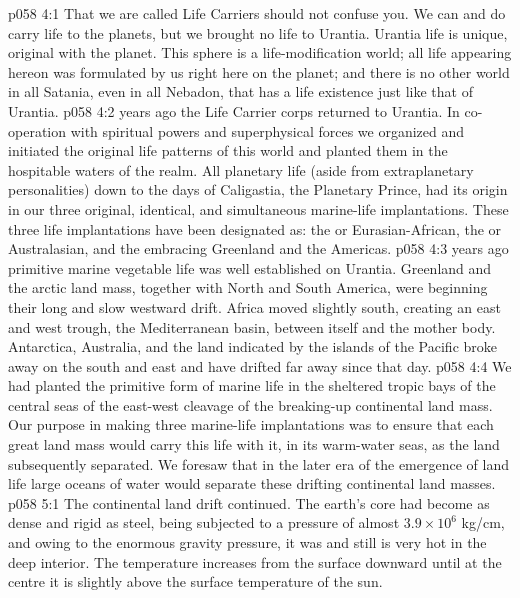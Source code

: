 \vs p058 4:1 That we are called Life Carriers should not confuse you. We can and do carry life to the planets, but we brought no life to Urantia. Urantia life is unique, original with the planet. This sphere is a life\hyp{}modification world; all life appearing hereon was formulated by us right here on the planet; and there is no other world in all Satania, even in all Nebadon, that has a life existence just like that of Urantia.
\vs p058 4:2 \pc {} years ago the Life Carrier corps returned to Urantia. In co\hyp{}operation with spiritual powers and superphysical forces we organized and initiated the original life patterns of this world and planted them in the hospitable waters of the realm. All planetary life (aside from extraplanetary personalities) down to the days of Caligastia, the Planetary Prince, had its origin in our three original, identical, and simultaneous marine\hyp{}life implantations. These three life implantations have been designated as: the  or Eurasian\hyp{}African, the  or Australasian, and the  embracing Greenland and the Americas.
\vs p058 4:3 \pc {} years ago primitive marine vegetable life was well established on Urantia. Greenland and the arctic land mass, together with North and South America, were beginning their long and slow westward drift. Africa moved slightly south, creating an east and west trough, the Mediterranean basin, between itself and the mother body. Antarctica, Australia, and the land indicated by the islands of the Pacific broke away on the south and east and have drifted far away since that day.
\vs p058 4:4 We had planted the primitive form of marine life in the sheltered tropic bays of the central seas of the east\hyp{}west cleavage of the breaking\hyp{}up continental land mass. Our purpose in making three marine\hyp{}life implantations was to ensure that each great land mass would carry this life with it, in its warm\hyp{}water seas, as the land subsequently separated. We foresaw that in the later era of the emergence of land life large oceans of water would separate these drifting continental land masses.
\vs p058 5:1 The continental land drift continued. The earth’s core had become as dense and rigid as steel, being subjected to a pressure of almost $3.9 \times 10^{6}$ kg/cm, and owing to the enormous gravity pressure, it was and still is very hot in the deep interior. The temperature increases from the surface downward until at the centre it is slightly above the surface temperature of the sun.

